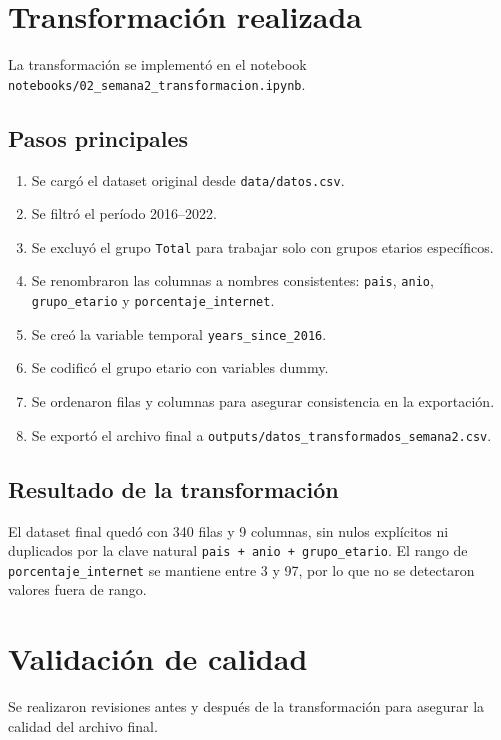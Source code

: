 \documentclass[12pt,a4paper]{article}
\begin{document}
\section{Transformación realizada}

La transformación se implementó en el notebook \texttt{notebooks/02\_semana2\_transformacion.ipynb}.

\subsection{Pasos principales}

\begin{enumerate}
    \item Se cargó el dataset original desde \texttt{data/datos.csv}.
    \item Se filtró el período 2016--2022.
    \item Se excluyó el grupo \texttt{Total} para trabajar solo con grupos etarios específicos.
    \item Se renombraron las columnas a nombres consistentes: \texttt{pais}, \texttt{anio}, \texttt{grupo\_etario} y \texttt{porcentaje\_internet}.
    \item Se creó la variable temporal \texttt{years\_since\_2016}.
    \item Se codificó el grupo etario con variables dummy.
    \item Se ordenaron filas y columnas para asegurar consistencia en la exportación.
    \item Se exportó el archivo final a \texttt{outputs/datos\_transformados\_semana2.csv}.
\end{enumerate}

\subsection{Resultado de la transformación}

El dataset final quedó con 340 filas y 9 columnas, sin nulos explícitos ni duplicados por la clave natural \texttt{pais + anio + grupo\_etario}. El rango de \texttt{porcentaje\_internet} se mantiene entre 3 y 97, por lo que no se detectaron valores fuera de rango.

\section{Validación de calidad}

Se realizaron revisiones antes y después de la transformación para asegurar la calidad del archivo final.
\end{document}
